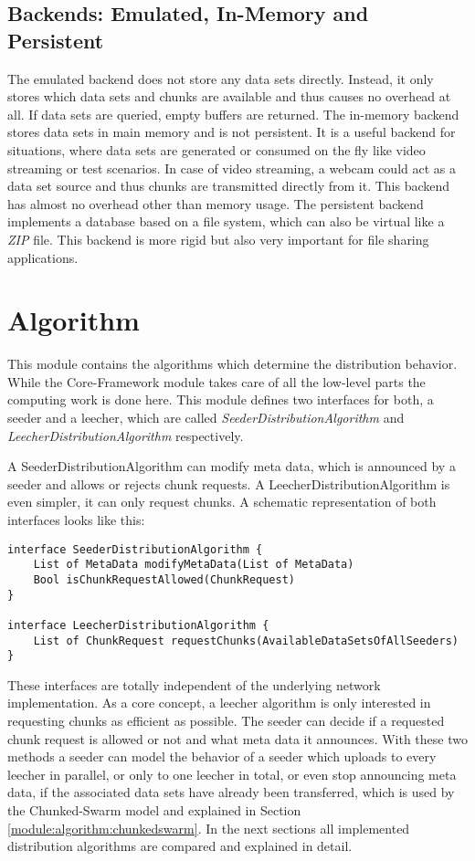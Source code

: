 \subsection{Backends: Emulated, In-Memory and Persistent}
\label{module:database:backend}
The emulated backend does not store any data sets directly. Instead, it only stores which data sets and chunks are available and thus causes no overhead at all. If data sets are queried, empty buffers are returned. The in-memory backend stores data sets in main memory and is not persistent. It is a useful backend for situations, where data sets are generated or consumed on the fly like video streaming or test scenarios. In case of video streaming, a webcam could act as a data set source and thus chunks are transmitted directly from it. This backend has almost no overhead other than memory usage. The persistent backend implements a database based on a file system, which can also be virtual like a \emph{ZIP} file. This backend is more rigid but also very important for file sharing applications.



\section{Algorithm}
\label{module:algorithm}
This module contains the algorithms which determine the distribution behavior. While the Core-Framework module takes care of all the low-level parts the computing work is done here. This module defines two interfaces for both, a seeder and a leecher, which are called \emph{SeederDistributionAlgorithm} and \emph{LeecherDistributionAlgorithm} respectively. 

A SeederDistributionAlgorithm can modify meta data, which is announced by a seeder and allows or rejects chunk requests. A LeecherDistributionAlgorithm is even simpler, it can only request chunks. A schematic representation of both interfaces looks like this:

\begin{verbatim}
interface SeederDistributionAlgorithm {
    List of MetaData modifyMetaData(List of MetaData)
    Bool isChunkRequestAllowed(ChunkRequest)
}

interface LeecherDistributionAlgorithm {
    List of ChunkRequest requestChunks(AvailableDataSetsOfAllSeeders)
}
\end{verbatim}

These interfaces are totally independent of the underlying network implementation. As a core concept, a leecher algorithm is only interested in requesting chunks as efficient as possible. The seeder can decide if a requested chunk request is allowed or not and what meta data it announces. With these two methods a seeder can model the behavior of a seeder which uploads to every leecher in parallel, or only to one leecher in total, or even stop announcing meta data, if the associated data sets have already been transferred, which is used by the Chunked-Swarm model and explained in Section \ref{module:algorithm:chunkedswarm}. In the next sections all implemented distribution algorithms are compared and explained in detail.

